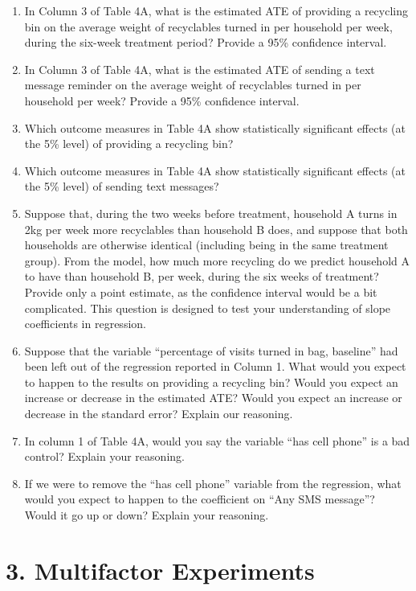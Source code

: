 \documentclass[
]{article}
\begin{document}
\begin{enumerate}
\def\labelenumi{\arabic{enumi}.}
\item
  In Column 3 of Table 4A, what is the estimated ATE of providing a
  recycling bin on the average weight of recyclables turned in per
  household per week, during the six-week treatment period? Provide a
  95\% confidence interval.
\item
  In Column 3 of Table 4A, what is the estimated ATE of sending a text
  message reminder on the average weight of recyclables turned in per
  household per week? Provide a 95\% confidence interval.
\item
  Which outcome measures in Table 4A show statistically significant
  effects (at the 5\% level) of providing a recycling bin?
\item
  Which outcome measures in Table 4A show statistically significant
  effects (at the 5\% level) of sending text messages?
\item
  Suppose that, during the two weeks before treatment, household A turns
  in 2kg per week more recyclables than household B does, and suppose
  that both households are otherwise identical (including being in the
  same treatment group). From the model, how much more recycling do we
  predict household A to have than household B, per week, during the six
  weeks of treatment? Provide only a point estimate, as the confidence
  interval would be a bit complicated. This question is designed to test
  your understanding of slope coefficients in regression.
\item
  Suppose that the variable ``percentage of visits turned in bag,
  baseline'' had been left out of the regression reported in Column 1.
  What would you expect to happen to the results on providing a
  recycling bin? Would you expect an increase or decrease in the
  estimated ATE? Would you expect an increase or decrease in the
  standard error? Explain our reasoning.
\item
  In column 1 of Table 4A, would you say the variable ``has cell phone''
  is a bad control? Explain your reasoning.
\item
  If we were to remove the ``has cell phone'' variable from the
  regression, what would you expect to happen to the coefficient on
  ``Any SMS message''? Would it go up or down? Explain your reasoning.
\end{enumerate}

\hypertarget{multifactor-experiments}{%
\section{3. Multifactor Experiments}\label{multifactor-experiments}}
\end{document}
